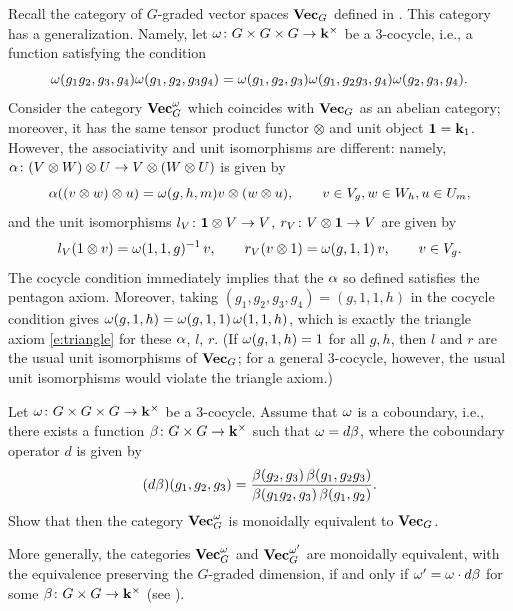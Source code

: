 \begin{example}\label{x:vecg-twisted}
  Recall the category of $G$-graded vector spaces $\mathbf{Vec}_G$ defined in
  . This category has a generalization. Namely, let
  $\omega\colon G\times G\times G\to \mathbf{k}^\times$ be a 3-cocycle, i.e., a
  function satisfying the condition
  $$
  \omega(g_1g_2, g_3, g_4)\omega (g_1, g_2, g_3g_4) = \omega(g_1, g_2, g_3)
     \omega(g_1, g_2g_3, g_4)\omega (g_2, g_3, g_4).
  $$
  Consider the category $\mathbf{Vec}^\omega_G$ which coincides with $\mathbf{Vec}_G$ as an
  abelian category; moreover, it has the same tensor product functor $\otimes$
  and unit object $\mathbf{1}=\mathbf{k}_1$. However, the associativity and unit isomorphisms
  are different: namely, $\alpha \colon (V\otimes W)\otimes U \to V \otimes
  (W\otimes U)$ is given by
  $$
    \alpha((v \otimes w) \otimes u )= \omega (g,h,m) v \otimes (w\otimes u),
    \qquad v\in V_g, w\in W_h, u\in U_m,
  $$
  and the unit isomorphisms $l_V\colon \mathbf{1}\otimes V\to V$,
  $r_V\colon V\otimes \mathbf{1}\to V$ are given by
  $$
    l_V(1\otimes v)=\omega(1,1,g)^{-1}\, v, \qquad r_V(v\otimes 1)=\omega(g,1,1)\, v,
    \qquad v\in V_g.
  $$
  The cocycle condition immediately implies that the $\alpha$ so defined satisfies
  the pentagon axiom. Moreover, taking $(g_1,g_2,g_3,g_4)=(g,1,1,h)$ in the
  cocycle condition gives $\omega(g,1,h)=\omega(g,1,1)\,\omega(1,1,h)$, which is exactly
  the triangle axiom \eqref{e:triangle} for these $\alpha$, $l$, $r$. (If
  $\omega(g,1,h)=1$ for all $g,h$, then $l$ and $r$ are the usual unit isomorphisms
  of $\mathbf{Vec}_G$; for a general 3-cocycle, however, the usual unit isomorphisms
  would violate the triangle axiom.)
\end{example}
\begin{exercise}\label{ec:twisted-group-cat}
  Let $\omega\colon G\times G\times G\to \mathbf{k}^\times$ be a 3-cocycle. Assume that
  $\omega$ is a coboundary, i.e., there exists a function $\beta\colon G\times
  G\to \mathbf{k}^\times$ such that $\omega=d\beta$, where the coboundary operator $d$
  is given by
  $$
    (d\beta)(g_1, g_2, g_3)=
    \frac{\beta(g_2, g_3)\,\beta(g_1, g_2g_3)}{\beta(g_1g_2, g_3)\,\beta(g_1, g_2)}.
  $$
  Show that then the category $\mathbf{Vec}_G^\omega$ is monoidally equivalent to
  $\mathbf{Vec}_G$.

  More generally, the categories $\mathbf{Vec}_G^\omega$ and $\mathbf{Vec}_G^{\omega'}$ are
  monoidally equivalent, with the equivalence preserving the $G$-graded
  dimension, if and only if $\omega'=\omega \cdot d\beta$ for some
  $\beta\colon G\times G\to \mathbf{k}^\times$ (see \cite[Section
  2.6]{etingof-fusion}).
\end{exercise}



